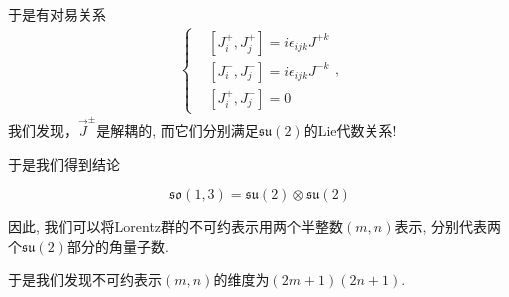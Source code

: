 于是有对易关系
\begin{align}
    \begin{cases}
        & [J^+_i, J^+_j]=i\epsilon_{ijk}J^{+k} \\
        & [J^-_i, J^-_j]=i\epsilon_{ijk}J^{-k} \\
        & [J^+_i, J^-_j]=0
    \end{cases},
\end{align}
我们发现，$\vec J^\pm$是解耦的, 而它们分别满足$\mathfrak{su}(2)$的Lie代数关系!

于是我们得到结论
\begin{important}
    \begin{equation}
        \mathfrak{so}(1, 3)=\mathfrak{su}(2)\otimes\mathfrak{su}(2)
    \end{equation}
\end{important}

因此, 我们可以将Lorentz群的不可约表示用两个半整数$(m, n)$表示, 分别代表两个$\mathfrak{su}(2)$部分的角量子数. 

于是我们发现不可约表示$(m, n)$的维度为$(2m+1)(2n+1)$.

